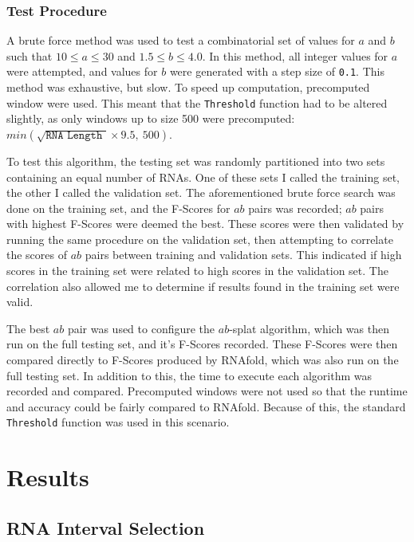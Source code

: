 \documentclass{cshonours}
\begin{document}
\subsection{Test Procedure}

A brute force method was used to test a combinatorial set of values for $a$ and $b$ such that $10 \leq a \leq 30$ and $1.5 \leq b \leq 4.0$. In this method, all integer values for $a$ were attempted, and values for $b$ were generated with a step size of \texttt{0.1}. This method was exhaustive, but slow. To speed up computation, precomputed window were used. This meant that the \texttt{Threshold} function had to be altered slightly, as only windows up to size 500 were precomputed:  $min(\sqrt{ \texttt {RNA Length } } \times 9.5, \: 500)$.

To test this algorithm, the testing set was randomly partitioned into two sets containing an equal number of RNAs. One of these sets I called the training set, the other I called the validation set. The aforementioned brute force search was done on the training set, and the F-Scores for $ab$ pairs was recorded; $ab$ pairs with highest F-Scores were deemed the best. These scores were then validated by running the same procedure on the validation set, then attempting to correlate the scores of $ab$ pairs between training and validation sets. This  indicated if high scores in the training set were related to high scores in the validation set. The correlation also allowed me to determine if results found in the training set were valid.

The best $ab$ pair was used to configure the $ab$-splat algorithm, which was then run on the full testing set, and it's F-Scores recorded. These F-Scores were then compared directly to F-Scores produced by RNAfold, which was also run on the full testing set. In addition to this, the time to execute each algorithm was recorded and compared. Precomputed windows were not used so that the runtime and accuracy could be fairly compared to RNAfold. Because of this, the standard \texttt{Threshold} function was used in this scenario.

\chapter{Results}

\section{RNA Interval Selection}
\end{document}
